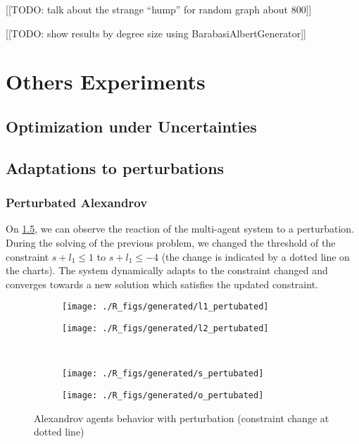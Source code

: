 [[TODO: talk about the strange \enquote{hump} for random graph about 800]]

[[TODO: show results by degree size using BarabasiAlbertGenerator]]

\chapter{Others Experiments}

\section{Optimization under Uncertainties}

\section{Adaptations to perturbations}

 \subsection{Perturbated Alexandrov}
 
On \figurename \ref{alexandrov_res_pert}, we can observe the reaction of the multi-agent system to a perturbation. During the solving of the previous problem, we changed the threshold of the constraint $s + l_1 \leq 1$ to $s + l_1 \leq -4$ (the change is indicated by a dotted line on the charts). The system dynamically adapts to the constraint changed and converges towards a new solution which satisfies the updated constraint.

\begin{figure}[]
\centering
  	\begin{subfigure}[b]{0.4\textwidth}
		\centering
		\texttt{[image: ./R\_figs/generated/l1\_pertubated]}
		\label{alexandrov_res_pert:l1}
	\end{subfigure}
	\begin{subfigure}[b]{0.4\textwidth}
		\centering
		\texttt{[image: ./R\_figs/generated/l2\_pertubated]}
		\label{alexandrov_res_pert:l2}
	\end{subfigure}
	\vspace{-20pt}
	\\
	\begin{subfigure}[b]{0.4\textwidth}
		\centering
		\texttt{[image: ./R\_figs/generated/s\_pertubated]}
		\label{alexandrov_res_pert:s}
	\end{subfigure}
	\begin{subfigure}[b]{0.4\textwidth}
		\centering
		\texttt{[image: ./R\_figs/generated/o\_pertubated]}
		\label{alexandrov_res_pert:o}
	\end{subfigure}
	
	\caption{Alexandrov agents behavior with perturbation (constraint change at dotted line)}
	\label{alexandrov_res_pert}
	
\end{figure}
